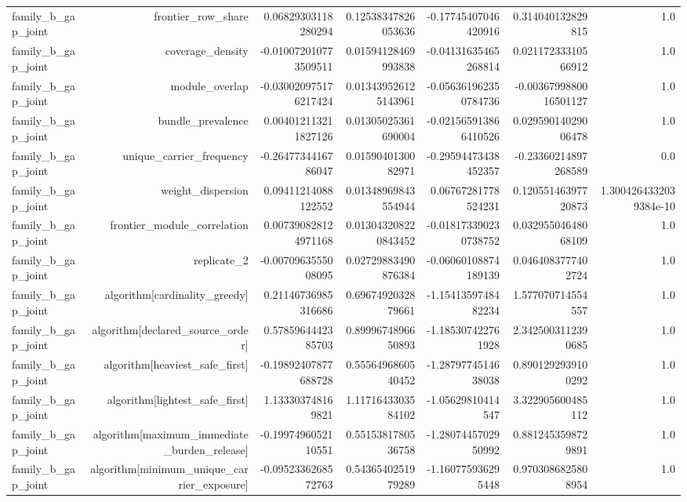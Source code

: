 {\begin{longtable}{lrrrrrr}
family\_b\_gap\_joint & frontier\_row\_share & 0.06829303118280294 & 0.12538347826053636 & -0.17745407046420916 & 0.314040132829815 & 1.0 \\
family\_b\_gap\_joint & coverage\_density & -0.010072010773509511 & 0.01594128469993838 & -0.04131635465268814 & 0.02117233310566912 & 1.0 \\
family\_b\_gap\_joint & module\_overlap & -0.030020975176217424 & 0.013439526125143961 & -0.056361962350784736 & -0.0036799880016501127 & 1.0 \\
family\_b\_gap\_joint & bundle\_prevalence & 0.004012113211827126 & 0.01305025361690004 & -0.021565913866410526 & 0.02959014029006478 & 1.0 \\
family\_b\_gap\_joint & unique\_carrier\_frequency & -0.2647734416786047 & 0.0159040130082971 & -0.29594473438452357 & -0.23360214897268589 & 0.0 \\
family\_b\_gap\_joint & weight\_dispersion & 0.09411214088122552 & 0.01348969843554944 & 0.06767281778524231 & 0.12055146397720873 & 1.3004264332039384e-10 \\
family\_b\_gap\_joint & frontier\_module\_correlation & 0.007390828124971168 & 0.013043208220843452 & -0.018173390230738752 & 0.03295504648068109 & 1.0 \\
family\_b\_gap\_joint & replicate\_2 & -0.0070963555008095 & 0.02729883490876384 & -0.06060108874189139 & 0.0464083777402724 & 1.0 \\
family\_b\_gap\_joint & algorithm[cardinality\_greedy] & 0.21146736985316686 & 0.6967492032879661 & -1.1541359748482234 & 1.577070714554557 & 1.0 \\
family\_b\_gap\_joint & algorithm[declared\_source\_order] & 0.5785964442385703 & 0.8999674896650893 & -1.185307422761928 & 2.3425003112390685 & 1.0 \\
family\_b\_gap\_joint & algorithm[heaviest\_safe\_first] & -0.19892407877688728 & 0.5556496860540452 & -1.2879774514638038 & 0.8901292939100292 & 1.0 \\
family\_b\_gap\_joint & algorithm[lightest\_safe\_first] & 1.133303748169821 & 1.1171643303584102 & -1.05629810414547 & 3.322905600485112 & 1.0 \\
family\_b\_gap\_joint & algorithm[maximum\_immediate\_burden\_release] & -0.1997496052110551 & 0.5515381780536758 & -1.2807445702950992 & 0.8812453598729891 & 1.0 \\
family\_b\_gap\_joint & algorithm[minimum\_unique\_carrier\_exposure] & -0.0952336268572763 & 0.5436540251979289 & -1.160775936295448 & 0.9703086825808954 & 1.0 \\

\end{longtable}}
